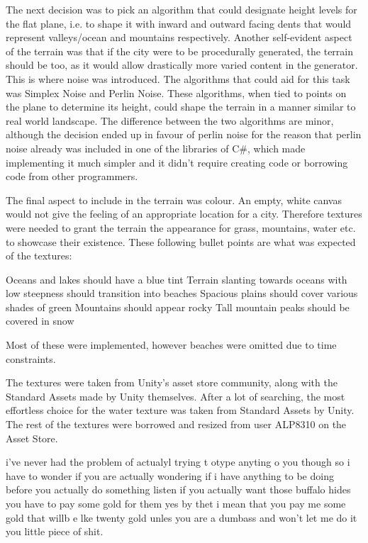 The next decision was to pick an algorithm that could designate height levels for the flat plane, i.e. to shape it with inward and outward facing dents that would represent valleys/ocean and mountains respectively.
Another self-evident aspect of the terrain was that if the city were to be procedurally generated, the terrain should be too, as it would allow drastically more varied content in the generator.
This is where noise was introduced.
The algorithms that could aid for this task was Simplex Noise and Perlin Noise.
These algorithms, when tied to points on the plane to determine its height, could shape the terrain in a manner similar to real world landscape.
The difference between the two algorithms are minor, although the decision ended up in favour of perlin noise for the reason that perlin noise already was included in one of the libraries of C#, which made implementing it much simpler and it didn’t require creating code or borrowing code from other programmers. 

The final aspect to include in the terrain was colour.
An empty, white canvas would not give the feeling of an appropriate location for a city.
Therefore textures were needed to grant the terrain the appearance for grass, mountains, water etc. to showcase their existence.
These following bullet points are what was expected of the textures:

Oceans and lakes should have a blue tint
Terrain slanting towards oceans with low steepness should transition into beaches
Spacious plains should cover various shades of green
Mountains should appear rocky
Tall mountain peaks should be covered in snow

Most of these were implemented, however beaches were omitted due to time constraints.

The textures were taken from Unity’s asset store community, along with the Standard Assets made by Unity themselves.
After a lot of searching, the most effortless choice for the water texture was taken from Standard Assets by Unity.
The rest of the textures were borrowed and resized from user ALP8310 on the Asset Store.

i’ve never had the problem of actualyl trying t otype anyting o you though so i have to wonder if you are actually wondering if i have anything to be doing before you actually do something listen if you actually want those buffalo hides you have to pay some gold for them yes by thet i mean that you pay me some gold that willb e lke twenty gold unles you are a dumbass and won't let me do it you little piece of shit.
